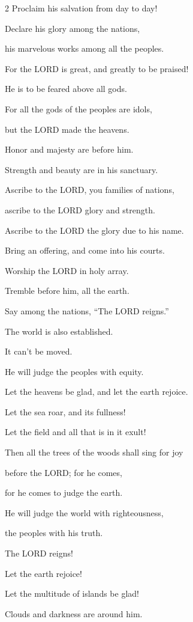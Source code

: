 \begin{multicols}{2}
	Proclaim his salvation from day to day!
	
	
	\myverse{}Declare his glory among the nations,
	
	his marvelous works among all the peoples.
	
	
	\myverse{}For the LORD is great, and greatly to be praised!
	
	He is to be feared above all gods.
	
	
	\myverse{}For all the gods of the peoples are idols,
	
	but the LORD made the heavens.
	
	
	\myverse{}Honor and majesty are before him.
	
	Strength and beauty are in his sanctuary.
	
	
	\myverse{}Ascribe to the LORD, you families of nations,
	
	ascribe to the LORD glory and strength.
	
	
	\myverse{}Ascribe to the LORD the glory due to his name.
	
	Bring an offering, and come into his courts.
	
	
	\myverse{}Worship the LORD in holy array.
	
	Tremble before him, all the earth.
	
	
	\myverse{}Say among the nations, “The LORD reigns.”
	
	The world is also established.
	
	It can’t be moved.
	
	He will judge the peoples with equity.
	
	
	\myverse{}Let the heavens be glad, and let the earth rejoice.
	
	Let the sea roar, and its fullness!
	
	
	\myverse{}Let the field and all that is in it exult!
	
	Then all the trees of the woods shall sing for joy
	
	
	\myverse{}before the LORD; for he comes,
	
	for he comes to judge the earth.
	
	He will judge the world with righteousness,
	
	the peoples with his truth.
	
	
	\mychapter{} \myverse*{}The LORD reigns!
	
	\quad Let the earth rejoice!
	
	Let the multitude of islands be glad!
	
	
	\myverse{}Clouds and darkness are around him.
	

\end{multicols}
